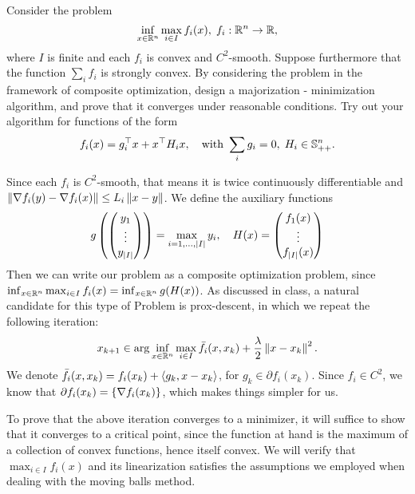 \documentclass[10pt]{article}
\begin{document}
\begin{Exercise}
    Consider the problem
    \[
        \inf_{x \in \mathbb{R}^n} \max_{i \in I} f_i(x), \;
        f_i : \mathbb{R}^n \to \mathbb{R},
    \]
    where $I$ is finite and each $f_i$ is convex and $C^2$-smooth. Suppose
    furthermore that the function $\sum_i f_i$ is strongly convex. By
    considering the problem in the framework of composite optimization, design
    a majorization - minimization algorithm, and prove that it converges under
    reasonable conditions. Try out your algorithm for functions of the form
    \[
        f_i(x) = g_i^\top x + x^\top H_i x, \quad \text{with }
        \sum_i g_i = 0, \; H_i \in \mathbb{S}_{++}^n.
    \]
\end{Exercise}
\begin{Answer}
    Since each $f_i$ is $C^2$-smooth, that means it is twice continuously
    differentiable and $\left \| \nabla f_i (y) - \nabla f_i (x) \right \| \leq L_i \left \| x -
    y \right \|$. We define the auxiliary functions
    \[
        g\left(
            \begin{pmatrix} y_1 \\ \vdots \\ y_{\left| I \right|} \end{pmatrix}
        \right) = \max_{i=1, \dots, \left| I \right|} y_i, \quad
        H(x) = \begin{pmatrix} 
            f_1(x) \\ \vdots \\ f_{\left| I \right|}(x) \end{pmatrix}
    \]
    Then we can write our problem as a composite optimization problem, since
    $\inf_{x \in \mathbb{R}^n} \max_{i \in I} f_i(x) = \inf_{x \in \mathbb{R}^n} g(H(x))$.
    As discussed in class, a natural candidate for this type of Problem is
    prox-descent, in which we repeat the following iteration:
    \[
        x_{k+1} \in \arg \inf_{x \in \mathbb{R}^n} \max_{i \in I} \bar{f}_i(x, x_k) +
        \frac{\lambda}{2} \left \| x - x_k \right \|^2.
    \]
    We denote $\bar{f}_i(x, x_k) = f_i(x_k) + \left\langle g_k, x - x_k \right\rangle$, for $g_k \in
    \partial f_i(x_k)$. Since $f_i \in C^2$, we know that $\partial f_i(x_k)
    = \left\{ \nabla f_i(x_k) \right\}$, which makes things simpler for us.

    To prove that the above iteration converges to a minimizer, it will suffice
    to show that it converges to a critical point, since the function at hand
    is the maximum of a collection of convex functions, hence itself convex. We
    will verify that $\max_{i \in I} f_i(x)$ and its linearization satisfies
    the assumptions we employed when dealing with the moving balls method.


\end{Answer}
\end{document}
